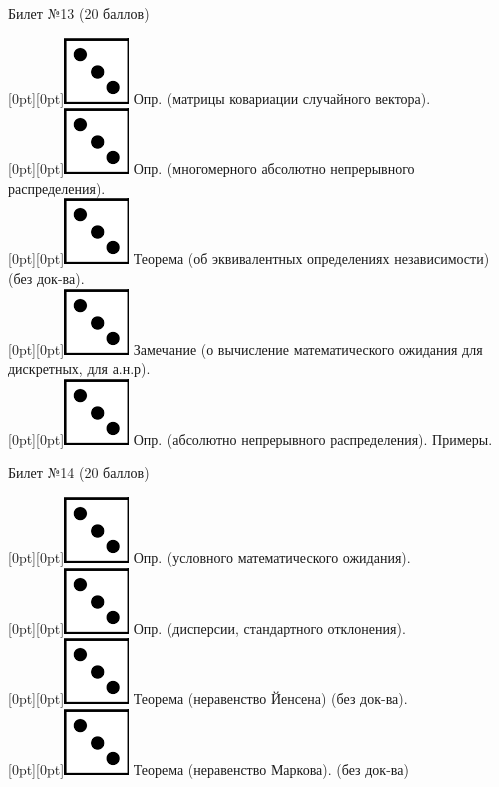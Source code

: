 \documentclass[preview]{standalone}
\begin{document}
\begin{center} {\Large Билет №13 (20 баллов)} \end{center}
\raisebox{-1pt}[0pt][0pt]{\includegraphics[width=0.02\linewidth]{3.png}} Опр. (матрицы ковариации случайного вектора). \\
\raisebox{-1pt}[0pt][0pt]{\includegraphics[width=0.02\linewidth]{3.png}} Опр. (многомерного абсолютно непрерывного распределения). \\
\raisebox{-1pt}[0pt][0pt]{\includegraphics[width=0.02\linewidth]{3.png}} Теорема (об эквивалентных определениях независимости) (без док-ва). \\
\raisebox{-1pt}[0pt][0pt]{\includegraphics[width=0.02\linewidth]{3.png}} Замечание (о вычисление  математического ожидания для дискретных, для а.н.р). \\
\raisebox{-1pt}[0pt][0pt]{\includegraphics[width=0.02\linewidth]{3.png}} Опр. (абсолютно непрерывного распределения). Примеры. \\
\begin{center} {\Large Билет №14 (20 баллов)} \end{center}
\raisebox{-1pt}[0pt][0pt]{\includegraphics[width=0.02\linewidth]{3.png}} Опр. (условного математического ожидания). \\
\raisebox{-1pt}[0pt][0pt]{\includegraphics[width=0.02\linewidth]{3.png}} Опр. (дисперсии, стандартного отклонения). \\ 
\raisebox{-1pt}[0pt][0pt]{\includegraphics[width=0.02\linewidth]{3.png}} Теорема (неравенство Йенсена) (без док-ва). \\
\raisebox{-1pt}[0pt][0pt]{\includegraphics[width=0.02\linewidth]{3.png}} Теорема (неравенство Маркова). (без док-ва) \\
\end{document}
